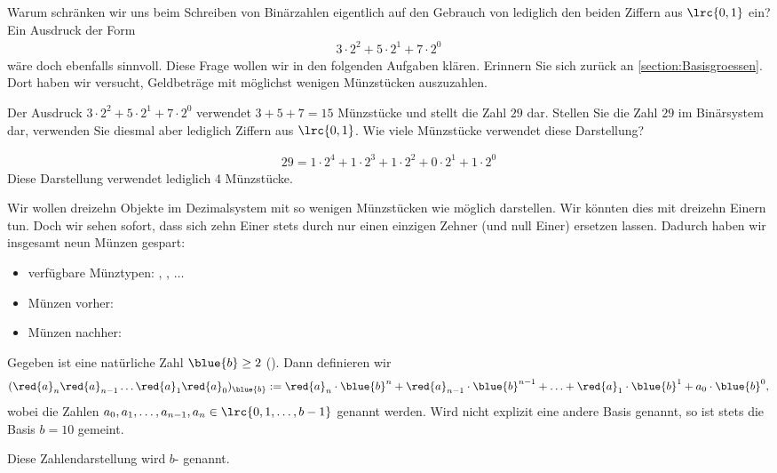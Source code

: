 Warum schränken wir uns beim Schreiben von Binärzahlen eigentlich auf den Gebrauch von lediglich den beiden Ziffern aus
$\lrc{0,1}$ ein? Ein Ausdruck der Form
\begin{align*}
	3\cdot 2^2 + 5\cdot 2^1 + 7\cdot 2^0
\end{align*}
wäre doch ebenfalls sinnvoll. Diese Frage wollen wir in den folgenden Aufgaben klären. Erinnern Sie sich zurück an \cref{section:Basisgroessen}.
Dort haben wir versucht, Geldbeträge mit möglichst wenigen Münzstücken auszuzahlen.

\begin{myexercise}
	Der Ausdruck $3\cdot 2^2 + 5\cdot 2^1 + 7\cdot 2^0$ verwendet $3+5+7 = 15$ Münzstücke und stellt die Zahl $29$ dar.
	Stellen Sie die Zahl $29$ im Binärsystem dar, verwenden Sie diesmal aber lediglich Ziffern aus $\lrc{0,1}$. Wie viele
	Münzstücke verwendet diese Darstellung?
	\begin{myanswer}
		\begin{align*}
			29 = 1\cdot 2^4 + 1\cdot 2^3 + 1\cdot 2^2 + 0\cdot 2^1 + 1\cdot 2^0
		\end{align*}
		Diese Darstellung verwendet lediglich 4 Münzstücke.
	\end{myanswer}
\end{myexercise}

\begin{myexample}\label{myexample:ersetzen}
Wir wollen dreizehn Objekte im Dezimalsystem mit so wenigen Münzstücken wie möglich darstellen. Wir könnten dies mit
dreizehn Einern tun. Doch wir sehen sofort, dass sich zehn Einer stets durch nur einen einzigen Zehner (und null
Einer) ersetzen lassen. Dadurch haben wir insgesamt neun Münzen gespart:
\begin{itemize}
	\item verfügbare Münztypen: , , $\ldots$
	\item Münzen vorher:
	\item Münzen nachher: 
\end{itemize}
\end{myexample}

\begin{mydefinition}
\label{mydefinition:badisch}
Gegeben ist eine natürliche Zahl $\blue{b}\geq 2$ (). Dann definieren wir
\begin{align*}
	(\red{a}_{n}\red{a}_{n-1}\ldots \red{a}_{1}\red{a}_{0})_{\blue{b}} := \red{a}_n\cdot \blue{b}^n + \red{a}_{n-1}\cdot \blue{b}^{n-1} + \ldots +\red{a}_1\cdot \blue{b}^1 + a_0\cdot
	\blue{b}^0,
\end{align*}
wobei die Zahlen $a_{0}, a_{1},\ldots, a_{n-1}, a_{n}\in\lrc{0,1,\ldots,b-1}$  genannt werden. Wird
nicht explizit eine andere Basis genannt, so ist stets die Basis $b=10$ gemeint.

Diese Zahlendarstellung wird $b$- genannt.
\end{mydefinition}

